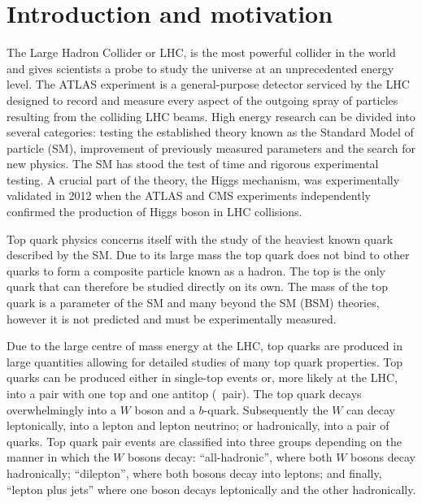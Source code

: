 \chapter{Introduction and motivation}\label{sec:Introduction}

The Large Hadron Collider or LHC, is the most powerful collider in the world and gives scientists a probe to study the universe at an unprecedented energy level. The ATLAS experiment is a general-purpose detector serviced by the LHC designed to record and measure every aspect of the outgoing spray of particles resulting from the colliding LHC beams. High energy research can be divided into several categories: testing the established theory known as the Standard Model of particle (SM), improvement of previously measured parameters and the search for new physics. The SM has stood the test of time and rigorous experimental testing. A crucial part of the theory, the Higgs mechanism, was experimentally validated in 2012 when the ATLAS and CMS experiments independently confirmed the production of Higgs boson in LHC collisions.

Top quark physics concerns itself with the study of the heaviest known quark described by the SM. Due to its large mass the top quark does not bind to other quarks to form a composite particle known as a hadron. The top is the only quark that can therefore be studied directly on its own. The mass of the top quark is a parameter of the SM and many beyond the SM (BSM) theories, however it is not predicted and must be experimentally measured.

Due to the large centre of mass energy at the LHC, top quarks are produced in large quantities allowing for detailed studies of many top quark properties. Top quarks can be produced either in single-top events or, more likely at the LHC, into a pair with one top and one antitop (\ttbar\ pair). The top quark decays overwhelmingly into a $W$ boson and a $b$-quark. Subsequently the $W$ can decay leptonically, into a lepton and lepton neutrino; or hadronically, into a pair of quarks. Top quark pair events are classified into three groups depending on the manner in which the $W$ bosons decay: ``all-hadronic'', where both $W$ bosons decay hadronically; ``dilepton'', where both bosons decay into leptons; and finally, ``lepton plus jets'' where one boson decays leptonically and the other hadronically.

